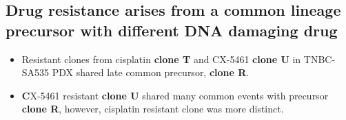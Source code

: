  \subsection{Drug resistance arises from a common lineage precursor with different DNA damaging drug}
\begin{itemize} 
  \item  Resistant clones from cisplatin \textbf{clone T} and CX-5461 \textbf{clone U} in TNBC-SA535 PDX shared late common precursor, \textbf{clone R}. 
   \item \textbf CX-5461 resistant \textbf{clone U} shared many common events with precursor \textbf{clone R}, however, cisplatin resistant clone was more distinct. 


\end{itemize}








